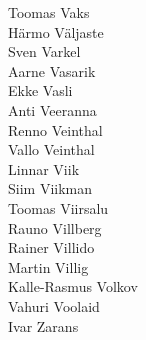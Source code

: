 \begin{multicols}{3}
Toomas Vaks\\
Härmo Väljaste\\
Sven Varkel\\
Aarne Vasarik\\
Ekke Vasli\\
Anti Veeranna\\
Renno Veinthal\\
Vallo Veinthal\\
Linnar Viik\\
Siim Viikman\\
Toomas Viirsalu\\
Rauno Villberg\\
Rainer Villido\\
Martin Villig\\
Kalle-Rasmus Volkov\\
Vahuri Voolaid\\
Ivar Zarans\\
\end{multicols}